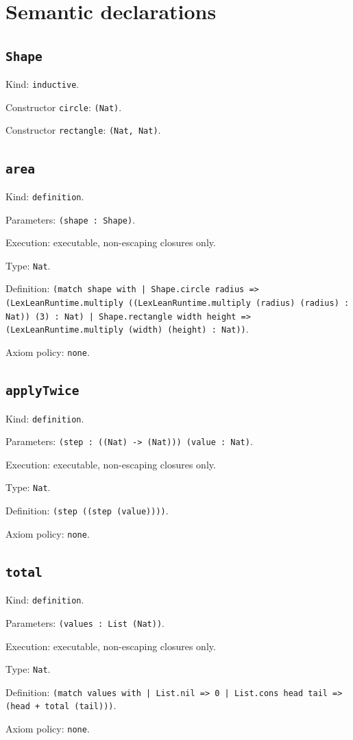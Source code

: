 \documentclass[11pt]{article}
\begin{document}
\section*{Semantic declarations}
\subsection*{\texttt{Shape}}
\noindent Kind: \texttt{inductive}.\par
\noindent Constructor \texttt{circle}: \texttt{(Nat)}.\par
\noindent Constructor \texttt{rectangle}: \texttt{(Nat, Nat)}.\par
\subsection*{\texttt{area}}
\noindent Kind: \texttt{definition}.\par
\noindent Parameters: \texttt{(shape : Shape)}.\par
\noindent Execution: executable, non-escaping closures only.\par
\noindent Type: \texttt{Nat}.\par
\noindent Definition: \texttt{(match shape with | Shape.circle radius => (LexLeanRuntime.multiply ((LexLeanRuntime.multiply (radius) (radius) : Nat)) (3) : Nat) | Shape.rectangle width height => (LexLeanRuntime.multiply (width) (height) : Nat))}.\par
\noindent Axiom policy: \texttt{none}.\par
\subsection*{\texttt{applyTwice}}
\noindent Kind: \texttt{definition}.\par
\noindent Parameters: \texttt{(step : ((Nat) -> (Nat))) (value : Nat)}.\par
\noindent Execution: executable, non-escaping closures only.\par
\noindent Type: \texttt{Nat}.\par
\noindent Definition: \texttt{(step ((step (value))))}.\par
\noindent Axiom policy: \texttt{none}.\par
\subsection*{\texttt{total}}
\noindent Kind: \texttt{definition}.\par
\noindent Parameters: \texttt{(values : List (Nat))}.\par
\noindent Execution: executable, non-escaping closures only.\par
\noindent Type: \texttt{Nat}.\par
\noindent Definition: \texttt{(match values with | List.nil => 0 | List.cons head tail => (head + total (tail)))}.\par
\noindent Axiom policy: \texttt{none}.\par
\end{document}
